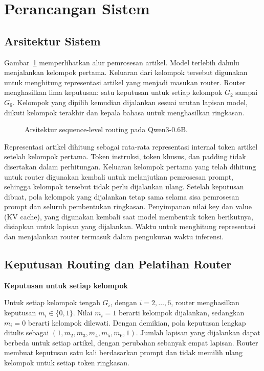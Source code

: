 \section{Perancangan Sistem}

\subsection{Arsitektur Sistem}

Gambar~\ref{fig:arsitektur-routing} memperlihatkan alur pemrosesan artikel. Model terlebih dahulu menjalankan kelompok pertama. Keluaran dari kelompok tersebut digunakan untuk menghitung representasi artikel yang menjadi masukan router. Router menghasilkan lima keputusan: satu keputusan untuk setiap kelompok $G_2$ sampai $G_6$. Kelompok yang dipilih kemudian dijalankan sesuai urutan lapisan model, diikuti kelompok terakhir dan kepala bahasa untuk menghasilkan ringkasan.

\begin{figure}[H]
  \centering
  \resizebox{\textwidth}{!}{}
  \caption{Arsitektur sequence-level routing pada Qwen3-0.6B.}
  \label{fig:arsitektur-routing}
\end{figure}

Representasi artikel dihitung sebagai rata-rata representasi internal token artikel setelah kelompok pertama. Token instruksi, token khusus, dan padding tidak disertakan dalam perhitungan. Keluaran kelompok pertama yang telah dihitung untuk router digunakan kembali untuk melanjutkan pemrosesan prompt, sehingga kelompok tersebut tidak perlu dijalankan ulang. Setelah keputusan dibuat, pola kelompok yang dijalankan tetap sama selama sisa pemrosesan prompt dan seluruh pembentukan ringkasan. Penyimpanan nilai key dan value (KV cache), yang digunakan kembali saat model membentuk token berikutnya, disiapkan untuk lapisan yang dijalankan. Waktu untuk menghitung representasi dan menjalankan router termasuk dalam pengukuran waktu inferensi.

\subsection{Keputusan Routing dan Pelatihan Router}

\medskip
\noindent\textbf{Keputusan untuk setiap kelompok}\par\smallskip

Untuk setiap kelompok tengah $G_i$, dengan $i=2,\ldots,6$, router menghasilkan keputusan $m_i\in\{0,1\}$. Nilai $m_i=1$ berarti kelompok dijalankan, sedangkan $m_i=0$ berarti kelompok dilewati. Dengan demikian, pola keputusan lengkap ditulis sebagai $(1,m_2,m_3,m_4,m_5,m_6,1)$. Jumlah lapisan yang dijalankan dapat berbeda untuk setiap artikel, dengan perubahan sebanyak empat lapisan. Router membuat keputusan satu kali berdasarkan prompt dan tidak memilih ulang kelompok untuk setiap token ringkasan.

